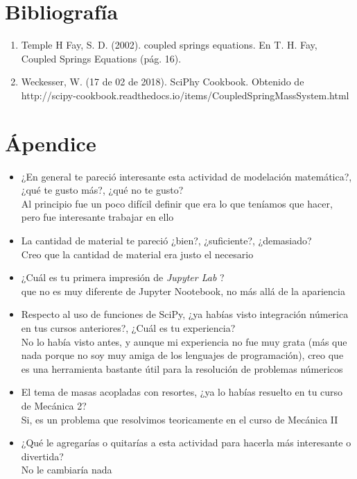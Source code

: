 \documentclass{article}
\begin{document}
\section{Bibliografía}
\begin{enumerate}
\item Temple H Fay, S. D. (2002). coupled springs equations. En T. H. Fay, Coupled Springs Equations (pág. 16).
\item Weckesser, W. (17 de 02 de 2018). SciPhy Cookbook. Obtenido de http://scipy-cookbook.readthedocs.io/items/CoupledSpringMassSystem.html
\end {enumerate}

\section{Ápendice}
\begin{itemize}
\item ¿En general te pareció interesante esta actividad de modelación matemática?, ¿qué te gusto más?, ¿qué no te gusto? \\ Al principio fue un poco difícil definir que era lo que teníamos que hacer, pero fue interesante trabajar en ello
\item La cantidad de material te pareció ¿bien?, ¿suficiente?, ¿demasiado? \\ Creo que la cantidad de material era justo el necesario
\item ¿Cuál es tu primera impresión de \textit{Jupyter Lab} ? \\ que no es muy diferente de Jupyter Nootebook, no más allá de la apariencia
\item Respecto al uso de funciones de SciPy, ¿ya habías visto integración númerica en tus cursos anteriores?, ¿Cuál es tu experiencia? \\ No lo había visto antes, y aunque mi experiencia no fue muy grata (más que nada porque no soy muy amiga de los lenguajes de programación), creo que es una herramienta bastante útil para la resolución de problemas númericos
\item El tema de masas acopladas con resortes, ¿ya lo habías resuelto en tu curso de Mecánica 2? \\ Si, es un problema que resolvimos teoricamente en el curso de Mecánica II
\item ¿Qué le agregarías o quitarías a esta actividad para hacerla más interesante o divertida? \\ No le cambiaría nada
\end{itemize}
\end{document}
